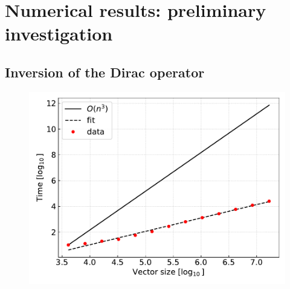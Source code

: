 \chapter{Numerical results: preliminary investigation}
\label{chapt:results_preliminary}

\section{Inversion of the Dirac operator}
\begin{figure}[h]
    \centering
    \includegraphics[scale=0.65]{figures/complexity.pdf}
    \caption{}
    \label{fig:complexity}
\end{figure}

